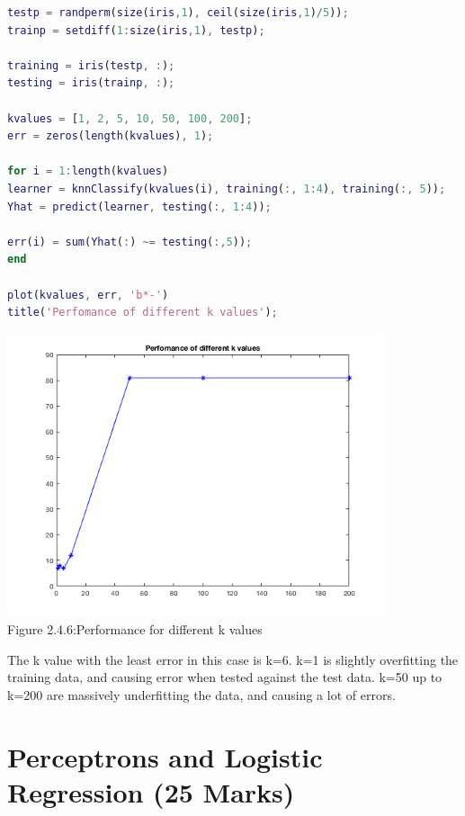 \documentclass[]{scrreprt}   %
\begin{document}
\begin{lstlisting}[language=Matlab]
testp = randperm(size(iris,1), ceil(size(iris,1)/5));
trainp = setdiff(1:size(iris,1), testp);

training = iris(testp, :);
testing = iris(trainp, :);

kvalues = [1, 2, 5, 10, 50, 100, 200];
err = zeros(length(kvalues), 1);

for i = 1:length(kvalues)
learner = knnClassify(kvalues(i), training(:, 1:4), training(:, 5));
Yhat = predict(learner, testing(:, 1:4));

err(i) = sum(Yhat(:) ~= testing(:,5));
end

plot(kvalues, err, 'b*-')
title('Perfomance of different k values');
\end{lstlisting}
\begin{center}
	\includegraphics[width=30em,keepaspectratio]{p4figure6.png}\\
	{Figure 2.4.6:Performance for different k values}
\end{center} 
\bigbreak
{The k value with the least error in this case is k=6. k=1 is slightly overfitting the training data, and causing error when tested against the test data. k=50 up to k=200 are massively underfitting the data, and causing a lot of errors. }

\section{Perceptrons and Logistic Regression (25 Marks)}
\end{document}
